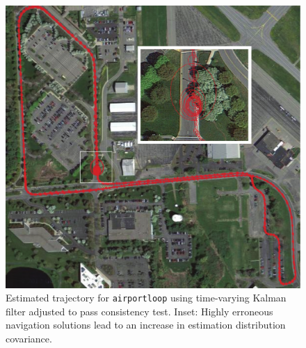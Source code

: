 \begin{figure}[!bthp]
\includegraphics[width=\columnwidth]{airportloop_map}
\caption{Estimated trajectory for \texttt{airportloop} using time-varying Kalman filter adjusted to pass consistency test.  Inset: Highly erroneous navigation solutions lead to an increase in estimation distribution covariance.}
\label{fig:airportloop_map}
\end{figure} 

